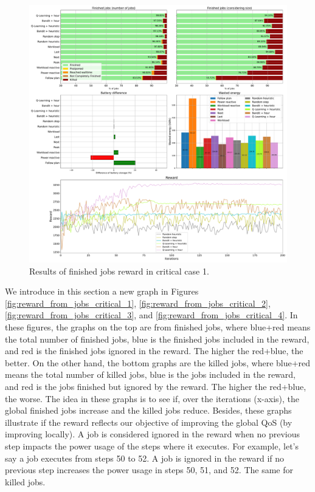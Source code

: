 \begin{figure}[!htb]
    \centering
    \includegraphics[scale=0.29]{Images/Learning_compensations/reward_finished_touched_profile_best_workload_1_with_noise_state_delta.pdf}
    \caption{Results of finished jobs reward in critical case 1.}
    \label{fig:touched_reward_results_critical_1}
\end{figure}

We introduce in this section a new graph in Figures \ref{fig:reward_from_jobs_critical_1}, \ref{fig:reward_from_jobs_critical_2}, \ref{fig:reward_from_jobs_critical_3}, and \ref{fig:reward_from_jobs_critical_4}. In these figures, the graphs on the top are from finished jobs, where blue+red means the total number of finished jobs, blue is the finished jobs included in the reward, and red is the finished jobs ignored in the reward. The higher the red+blue, the better. On the other hand, the bottom graphs are the killed jobs, where blue+red means the total number of killed jobs, blue is the jobs included in the reward, and red is the jobs finished but ignored by the reward. The higher the red+blue, the worse. The idea in these graphs is to see if, over the iterations (x-axis), the global finished jobs increase and the killed jobs reduce. Besides, these graphs illustrate if the reward reflects our objective of improving the global QoS (by improving locally). A job is considered ignored in the reward when no previous step impacts the power usage of the steps where it executes. For example, let's say a job executes from steps 50 to 52. A job is ignored in the reward if no previous step increases the power usage in steps 50, 51, and 52. The same for killed jobs.

